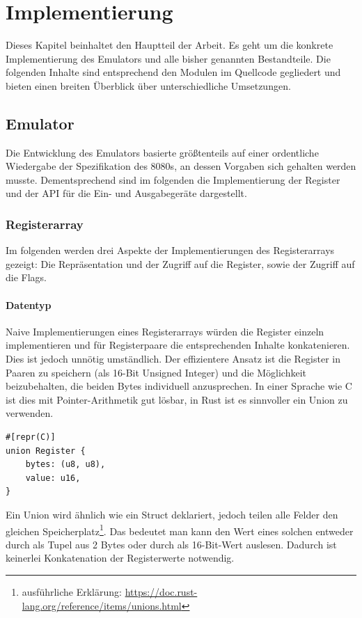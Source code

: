 \chapter{Implementierung}\label{chap:impl}

Dieses Kapitel beinhaltet den Hauptteil der Arbeit. Es geht um die konkrete Implementierung des Emulators und alle bisher genannten Bestandteile. Die folgenden Inhalte sind entsprechend den Modulen im Quellcode gegliedert und bieten einen breiten Überblick über unterschiedliche Umsetzungen.

\section{Emulator}

Die Entwicklung des Emulators basierte größtenteils auf einer ordentliche Wiedergabe der Spezifikation des 8080s, an dessen Vorgaben sich gehalten werden musste. Dementsprechend sind im folgenden die Implementierung der Register und der \ac{API} für die Ein- und Ausgabegeräte dargestellt.

\subsection{Registerarray}

Im folgenden werden drei Aspekte der Implementierungen des Registerarrays gezeigt: Die Repräsentation und der Zugriff auf die Register, sowie der Zugriff auf die Flags.

\subsubsection{Datentyp}

Naive Implementierungen eines Registerarrays würden die Register einzeln implementieren und für Registerpaare die entsprechenden Inhalte konkatenieren.
Dies ist jedoch unnötig umständlich. Der effizientere Ansatz ist die Register in Paaren zu speichern (als 16-Bit Unsigned Integer) und die Möglichkeit beizubehalten, die beiden Bytes individuell anzusprechen. In einer Sprache wie C ist dies mit Pointer-Arithmetik gut lösbar, in Rust ist es sinnvoller ein Union zu verwenden.

\begin{verbatim}
#[repr(C)]
union Register {
    bytes: (u8, u8),
    value: u16,
}
\end{verbatim}

Ein Union wird ähnlich wie ein Struct deklariert, jedoch teilen alle Felder den gleichen Speicherplatz\footnote{ausführliche Erklärung: \url{https://doc.rust-lang.org/reference/items/unions.html}}. Das bedeutet man kann den Wert eines solchen  entweder durch  als Tupel aus 2 Bytes oder durch  als 16-Bit-Wert auslesen. Dadurch ist keinerlei Konkatenation der Registerwerte notwendig.


